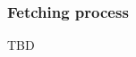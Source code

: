 \documentclass[10pt]{proc}
\begin{document}





\subsubsection{Fetching process}
TBD

\end{document}
